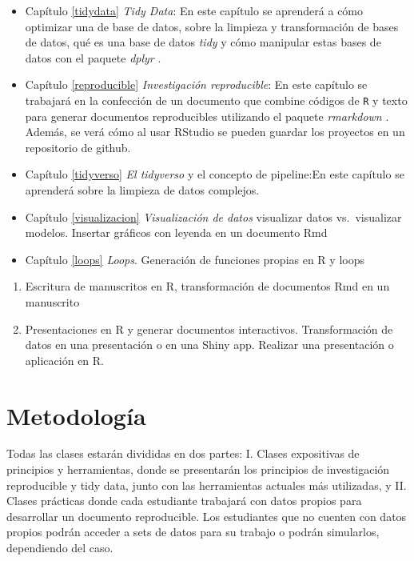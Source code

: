 \documentclass[]{book}
\begin{document}
\begin{itemize}
\item
  Capítulo \ref{tidydata} \emph{Tidy Data}: En este capítulo se
  aprenderá a cómo optimizar una de base de datos, sobre la limpieza y
  transformación de bases de datos, qué es una base de datos \emph{tidy}
  y cómo manipular estas bases de datos con el paquete \emph{dplyr}
  \citep{R-dplyr}.
\item
  Capítulo \ref{reproducible} \emph{Investigación reproducible}: En este
  capítulo se trabajará en la confección de un documento que combine
  códigos de \texttt{R} y texto para generar documentos reproducibles
  utilizando el paquete \emph{rmarkdown} \citep{Allaire2018}. Además, se
  verá cómo al usar RStudio se pueden guardar los proyectos en un
  repositorio de github.
\item
  Capítulo \ref{tidyverso} \emph{El tidyverso} y el concepto de
  pipeline:En este capítulo se aprenderá sobre la limpieza de datos
  complejos.
\item
  Capítulo \ref{visualizacion} \emph{Visualización de datos} visualizar
  datos vs.~visualizar modelos. Insertar gráficos con leyenda en un
  documento Rmd
\item
  Capítulo \ref{loops} \emph{Loops}. Generación de funciones propias en
  R y loops
\end{itemize}

\begin{enumerate}
\def\labelenumi{\arabic{enumi}.}
\setcounter{enumi}{5}
\item
  Escritura de manuscritos en R, transformación de documentos Rmd en un
  manuscrito
\item
  Presentaciones en R y generar documentos interactivos. Transformación
  de datos en una presentación o en una Shiny app. Realizar una
  presentación o aplicación en R.
\end{enumerate}

\hypertarget{metodologia}{%
\section{Metodología}\label{metodologia}}

Todas las clases estarán divididas en dos partes: I. Clases expositivas
de principios y herramientas, donde se presentarán los principios de
investigación reproducible y tidy data, junto con las herramientas
actuales más utilizadas, y II. Clases prácticas donde cada estudiante
trabajará con datos propios para desarrollar un documento reproducible.
Los estudiantes que no cuenten con datos propios podrán acceder a sets
de datos para su trabajo o podrán simularlos, dependiendo del caso.
\end{document}
